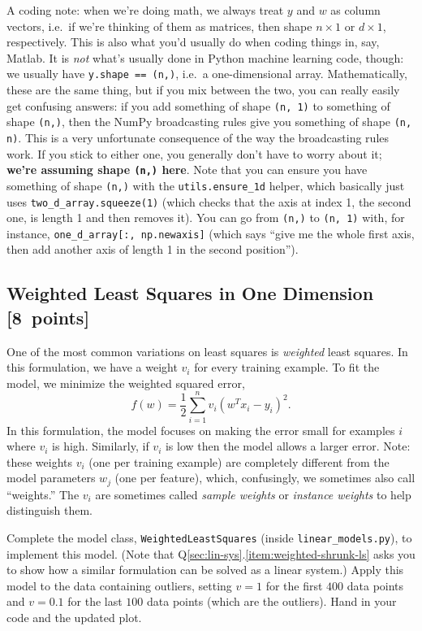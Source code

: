 \documentclass{article}
\newcommand{\blu}[1]{{\textcolor{blu}{#1}}}
\let\ask\blu
\newcommand\pts[1]{\textcolor{pointscolour}{[#1~points]}}
\begin{document}
A coding note:
when we're doing math, we always treat $y$ and $w$ as column vectors,
i.e.\ if we're thinking of them as matrices, then shape $n \times 1$ or $d \times 1$, respectively.
This is also what you'd usually do when coding things in, say, Matlab.
It is \emph{not} what's usually done in Python machine learning code, though:
we usually have \verb|y.shape == (n,)|, i.e.\ a one-dimensional array.
Mathematically, these are the same thing, but if you mix between the two,
you can really easily get confusing answers:
if you add something of shape \texttt{(n, 1)} to something of shape \texttt{(n,)},
then the NumPy broadcasting rules give you something of shape \texttt{(n, n)}.
This is a very unfortunate consequence of the way the broadcasting rules work.
If you stick to either one, you generally don't have to worry about it;
\textbf{we're assuming shape \texttt{(n,)} here}.
Note that you can
ensure you have something of shape \texttt{(n,)} with the \texttt{utils.ensure\_1d} helper, which basically just uses
\texttt{two\_d\_array.squeeze(1)}
(which checks that the axis at index 1, the second one, is length 1 and then removes it).
You can go from \texttt{(n,)} to \texttt{(n, 1)} with, for instance, \texttt{one\_d\_array[:, np.newaxis]}
(which says ``give me the whole first axis, then add another axis of length 1 in the second position'').

\subsection{Weighted Least Squares in One Dimension \pts{8}}

One of the most common variations on least squares is \emph{weighted} least squares. In this formulation, we have a weight $v_i$ for every training example. To fit the model, we minimize the weighted squared error,
\[
f(w) =  \frac{1}{2}\sum_{i=1}^n v_i(w^Tx_i - y_i)^2.
\]
In this formulation, the model focuses on making the error small for examples $i$ where $v_i$ is high. Similarly, if $v_i$ is low then the model allows a larger error. Note: these weights $v_i$ (one per training example) are completely different from the model parameters $w_j$ (one per feature), which, confusingly, we sometimes also call ``weights.'' The $v_i$ are sometimes called \emph{sample weights} or \emph{instance weights} to help distinguish them.

Complete the model class, \texttt{WeightedLeastSquares} (inside \texttt{linear\_models.py}), to implement this model.
(Note that Q\ref{sec:lin-sys}.\ref{item:weighted-shrunk-ls} asks you to show how a similar formulation can be solved as a linear system.)
Apply this model to the data containing outliers, setting $v = 1$ for the first
$400$ data points and $v = 0.1$ for the last $100$ data points (which are the outliers).
\ask{Hand in your code and the updated plot}.
\end{document}
